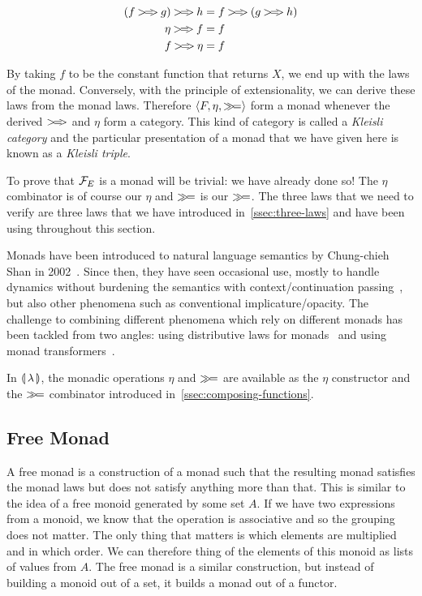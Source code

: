 \begin{align*}
  (f \kleisli g) \kleisli h &= f \kleisli (g \kleisli h) \\
  \eta \kleisli f &= f \\
  f \kleisli \eta &= f
\end{align*}

By taking $f$ to be the constant function that returns $X$, we end up with
the laws of the monad. Conversely, with the principle of extensionality, we
can derive these laws from the monad laws. Therefore
$\left<F, \eta, \mathbin{\gg\!=}\right>$ form a monad whenever the derived
$\mathbin{>\!=\!\!>}$ and $\eta$ form a category. This kind of category is called a
\emph{Kleisli category} and the particular presentation of a monad that we
have given here is known as a \emph{Kleisli triple}.

To prove that $\mathcal{F}_E$ is a monad will be trivial: we have already done so!
The $\eta$ combinator is of course our $\eta$ and $\mathbin{\gg\!=}$ is our
$\mathbin{\gg\!=}$. The three laws that we need to verify are three laws that we
have introduced in~\ref{ssec:three-laws} and have been using throughout
this section.

Monads have been introduced to natural language semantics by Chung-chieh
Shan in 2002~\cite{shan2002monads}. Since then, they have seen occasional
use, mostly to handle dynamics without burdening the semantics with
context/continuation passing~\cite{unger2011dynamic,champollion2015back},
but also other phenomena such as conventional
implicature/opacity\cite{giorgolo2011multidimensional,giorgolo2014monads,giorgolo2012missing}. The
challenge to combining different phenomena which rely on different monads
has been tackled from two angles: using distributive laws for
monads~\cite{giorgolo2015natural} and using monad
transformers~\cite{charlow2014semantics,barker2015monads}.

In $\llparenthesis \, \lambda \, \rrparenthesis$, the monadic operations $\eta$ and $\mathbin{\gg\!=}$ are available
as the $\eta$ constructor and the $\mathbin{\gg\!=}$ combinator introduced
in~\ref{ssec:composing-functions}.

\subsection{Free Monad}
\label{ssec:free-monad}

A free monad is a construction of a monad such that the resulting monad
satisfies the monad laws but does not satisfy anything more than that. This
is similar to the idea of a free monoid generated by some set $A$. If we
have two expressions from a monoid, we know that the operation is
associative and so the grouping does not matter. The only thing that
matters is which elements are multiplied and in which order. We can
therefore thing of the elements of this monoid as lists of values from
$A$. The free monad is a similar construction, but instead of building a
monoid out of a set, it builds a monad out of a functor.

